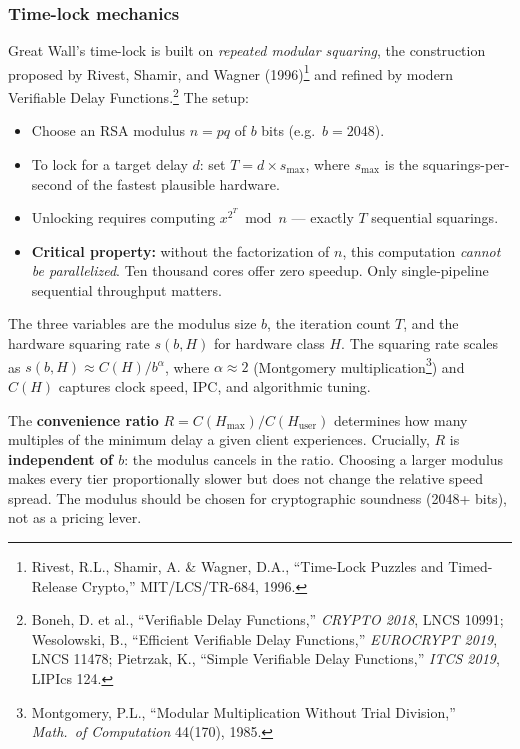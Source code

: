 \documentclass[a4paper,11pt]{article}
\begin{document}
\subsubsection{Time-lock mechanics}

Great Wall's time-lock is built on \textit{repeated modular squaring}, the construction proposed by Rivest, Shamir, and Wagner (1996)\footnote{Rivest, R.L., Shamir, A. \& Wagner, D.A., ``Time-Lock Puzzles and Timed-Release Crypto,'' MIT/LCS/TR-684, 1996.} and refined by modern Verifiable Delay Functions.\footnote{Boneh, D. et al., ``Verifiable Delay Functions,'' \textit{CRYPTO 2018}, LNCS 10991; Wesolowski, B., ``Efficient Verifiable Delay Functions,'' \textit{EUROCRYPT 2019}, LNCS 11478; Pietrzak, K., ``Simple Verifiable Delay Functions,'' \textit{ITCS 2019}, LIPIcs 124.} The setup:

\begin{itemize}[nosep,leftmargin=1.5em]
  \item Choose an RSA modulus $n = pq$ of $b$ bits (e.g.\ $b = 2048$).
  \item To lock for a target delay $d$: set $T = d \times s_{\max}$, where $s_{\max}$ is the squarings-per-second of the fastest plausible hardware.
  \item Unlocking requires computing $x^{2^T} \bmod n$ --- exactly $T$ sequential squarings.
  \item \textbf{Critical property:} without the factorization of $n$, this computation \textit{cannot be parallelized}. Ten thousand cores offer zero speedup. Only single-pipeline sequential throughput matters.
\end{itemize}

\noindent The three variables are the modulus size $b$, the iteration count $T$, and the hardware squaring rate $s(b, H)$ for hardware class $H$. The squaring rate scales as $s(b,H) \approx C(H) / b^\alpha$, where $\alpha \approx 2$ (Montgomery multiplication\footnote{Montgomery, P.L., ``Modular Multiplication Without Trial Division,'' \textit{Math.\ of Computation} 44(170), 1985.}) and $C(H)$ captures clock speed, IPC, and algorithmic tuning.

The \textbf{convenience ratio} $R = C(H_{\max}) / C(H_{\text{user}})$ determines how many multiples of the minimum delay a given client experiences. Crucially, $R$ is \textbf{independent of $b$}: the modulus cancels in the ratio. Choosing a larger modulus makes every tier proportionally slower but does not change the relative speed spread. The modulus should be chosen for cryptographic soundness (2048+ bits), not as a pricing lever.
\end{document}
